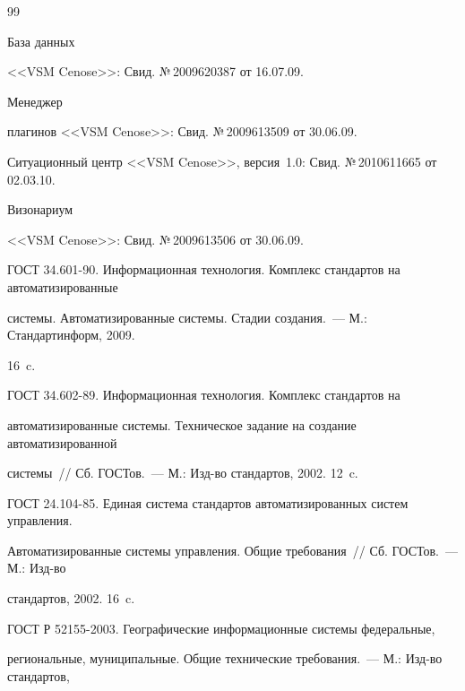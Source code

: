 {{\begin{thebibliography}{99}


 База данных 


<<VSM Cenose>>: Свид. №\,2009620387 от 16.07.09.




 Менеджер 


плагинов <<VSM Cenose>>: Свид. №\,2009613509 от 30.06.09.






Ситуационный центр <<VSM Cenose>>, версия~1.0: Свид. №\,2010611665 от 02.03.10.




 Визонариум 


<<VSM Cenose>>: Свид. №\,2009613506 от 30.06.09.




ГОСТ 34.601-90. Информационная технология. Комплекс стандартов на автоматизированные 


сис\-те\-мы. Автоматизированные сис\-те\-мы. Стадии создания.~--- М.: Стандартинформ, 2009. 


16~c. 




ГОСТ 34.602-89. Информационная технология. Комплекс стандартов на 


автоматизированные сис\-те\-мы. Техническое задание на создание автоматизированной 


сис\-те\-мы~/\!\!/ Сб. ГОСТов.~--- М.: Изд-во стандартов, 2002. 12~c.




ГОСТ 24.104-85. Единая сис\-те\-ма стандартов автоматизированных сис\-тем управ\-ле\-ния. 


Автоматизированные сис\-те\-мы управ\-ле\-ния. Общие требования~/\!\!/ Сб. \mbox{ГОСТов}.~--- М.: Изд-во 


стандартов, 2002. 16~c.




ГОСТ Р 52155-2003. Географические информационные сис\-те\-мы федеральные, 


региональные, муниципальные. Общие технические требования.~--- М.: Изд-во стандартов, 



\end{thebibliography}}}
